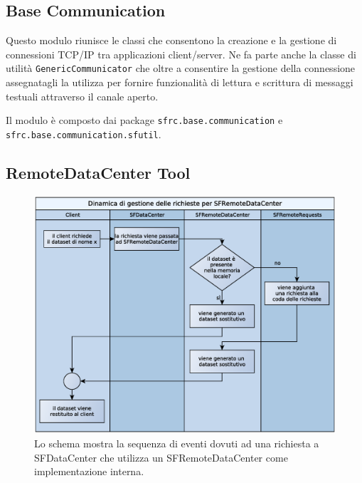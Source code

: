
\subsection{Base Communication}
\label{sub:basecommodule}
Questo modulo riunisce le classi che consentono la creazione e la gestione di connessioni TCP/IP tra applicazioni client/server. Ne fa parte anche la classe di utilit\`a \texttt{GenericCommunicator} che oltre a consentire la gestione della connessione assegnatagli la utilizza per fornire funzionalit\`a di lettura e scrittura di messaggi testuali attraverso il canale aperto.

Il modulo \`e composto dai package \texttt{sfrc.base.communication} e \\\texttt{sfrc.base.communication.sfutil}.

\subsection{RemoteDataCenter Tool}
\label{sub:remotedatacentertoolmodule}

\begin{figure}[t]
\begin{center}
\includegraphics[width=\textwidth]{Immagini/DinamicaSFRemoteDataCenter}
\caption{Lo schema mostra la sequenza di eventi dovuti ad una richiesta a SFDataCenter che utilizza un SFRemoteDataCenter come implementazione interna.\label{f:dinamicasfremotedatacenter}} 
\end{center} 
\end{figure}

